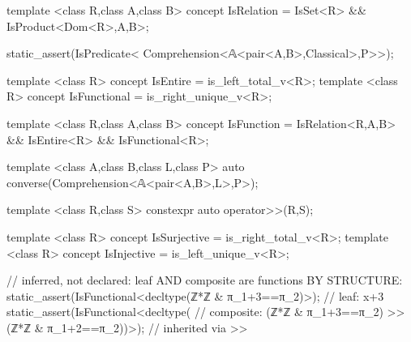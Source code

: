 \documentclass[11pt, a4paper]{article}
\begin{document}
\begin{listing}[htbp]
\caption{The spec surface, and where pluggability goes.
\textbf{Left}: the core concepts, a relation as an  on the product $A \times B$, a function as its entire, functional refinement.
\textbf{Right}: the combinators of the calculus of relations, composition the same \cppinline{>>} functions use.
\textbf{Bottom}: the four properties are \emph{pluggable} traits (trust at the leaves), but inferred where structure decides: a leaf carries one by its predicate shape, and a composite inherits it through \cppinline{>>} (the compositional closure of Table~\ref{tab:relation-quantifier}'s containments), so a graph and its relative product are functions \emph{by structure}, with no opt-in flag.}
\label{lst:relation_spec}
\noindent
\begin{minipage}[t]{0.49\linewidth}
\begin{cpp}
template <class R,class A,class B>
concept IsRelation =
  IsSet<R> && IsProduct<Dom<R>,A,B>;

static_assert(IsPredicate<
  Comprehension<𝔸<pair<A,B>,Classical>,P>>);

template <class R> concept
IsEntire = is_left_total_v<R>;
template <class R> concept
IsFunctional = is_right_unique_v<R>;

template <class R,class A,class B>
concept IsFunction =
  IsRelation<R,A,B> &&
  IsEntire<R> && IsFunctional<R>;
\end{cpp}
\end{minipage}\hfill
\begin{minipage}[t]{0.49\linewidth}
\begin{cpp}
template <class A,class B,class L,class P>
auto converse(Comprehension<𝔸<pair<A,B>,L>,P>);

template <class R,class S>
constexpr auto operator>>(R,S);

template <class R> concept
IsSurjective = is_right_total_v<R>;
template <class R> concept
IsInjective = is_left_unique_v<R>;
\end{cpp}
\end{minipage}

\vspace{0.4em}
\noindent
\begin{minipage}[t]{0.99\linewidth}
\begin{cpp}
// inferred, not declared: leaf AND composite are functions BY STRUCTURE:
static_assert(IsFunctional<decltype(ℤ*ℤ & π_1+3==π_2)>);  // leaf: x+3
static_assert(IsFunctional<decltype(                           // composite:
  (ℤ*ℤ & π_1+3==π_2) >> (ℤ*ℤ & π_1+2==π_2))>);       //  inherited via >>
\end{cpp}
\end{minipage}
\end{listing}
\end{document}
